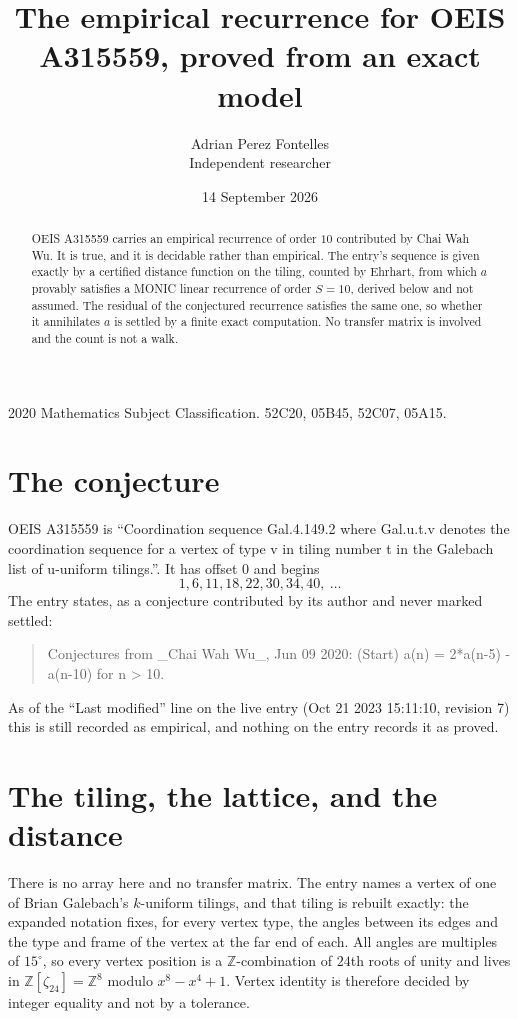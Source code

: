 \documentclass[11pt,a4paper]{article}
\title{The empirical recurrence for OEIS A315559, proved from an exact model}
\author{Adrian Perez Fontelles\\ \small Independent researcher}
\date{14 September 2026}
\theoremstyle{plain}
\theoremstyle{definition}
\begin{document}
\maketitle

\begin{abstract}
OEIS A315559 carries an empirical recurrence of order $10$ contributed by Chai Wah Wu. It is true, and it is
decidable rather than empirical. The entry's sequence is given exactly by a certified distance function on the tiling, counted by Ehrhart, from
which $a$ provably satisfies a MONIC linear recurrence of order $S=10$, derived below and not
assumed. The residual of the conjectured recurrence satisfies the same one, so whether it
annihilates $a$ is settled by a finite exact computation. No transfer matrix is involved and the count is not a walk.
\end{abstract}

\noindent\small 2020 Mathematics Subject Classification. 52C20, 05B45, 52C07, 05A15.\normalsize

\section{The conjecture}

OEIS A315559 is ``Coordination sequence Gal.4.149.2 where Gal.u.t.v denotes the coordination sequence for a vertex of type v in tiling number t in the Galebach list of u-uniform tilings.''. It has offset $0$ and begins
\[
1, 6, 11, 18, 22, 30, 34, 40,\ \dots
\]
The entry states, as a conjecture contributed by its author and never marked settled:
\begin{quote}
Conjectures from \_Chai Wah Wu\_, Jun 09 2020: (Start) a(n) = 2*a(n-5) - a(n-10) for n > 10.
\end{quote}
As of the ``Last modified'' line on the live entry (Oct 21 2023 15:11:10, revision 7)
this is still recorded as empirical, and nothing on the entry records it as proved.

\section{The tiling, the lattice, and the distance}

There is no array here and no transfer matrix. The entry names a vertex of one of Brian
Galebach's $k$-uniform tilings, and that tiling is rebuilt exactly: the expanded notation
fixes, for every vertex type, the angles between its edges and the type and frame of the
vertex at the far end of each. All angles are multiples of $15^\circ$, so every vertex
position is a $\mathbb{Z}$-combination of $24$th roots of unity and lives in
$\mathbb{Z}[\zeta_{24}]=\mathbb{Z}^{8}$ modulo $x^{8}-x^{4}+1$. Vertex identity is
therefore decided by integer equality and not by a tolerance.
\end{document}
